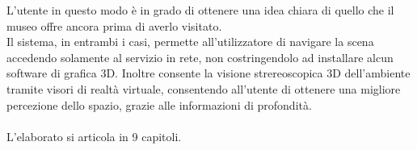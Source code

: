 L'utente in questo modo è in grado di ottenere una idea chiara di quello che il museo offre ancora prima di averlo visitato. %
\\
Il sistema, in entrambi i casi, permette all’utilizzatore di navigare la scena accedendo solamente al servizio in rete, non costringendolo ad installare alcun software di grafica 3D.
Inoltre consente la visione strereoscopica 3D dell'ambiente tramite visori di realtà virtuale, consentendo all’utente di ottenere una migliore percezione dello spazio, grazie alle informazioni di profondità.
\\
\\
L'elaborato si articola in 9 capitoli.
